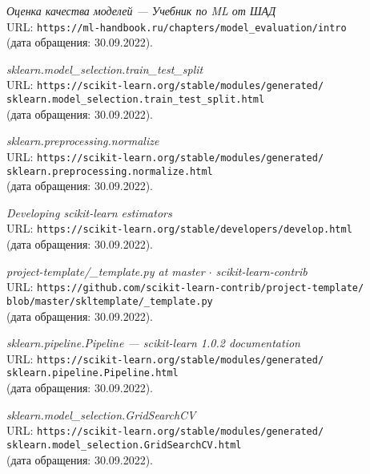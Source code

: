 \begin{thebibliography}{99}    
{\itshape Оценка качества моделей --- Учебник по ML от ШАД}\\
URL: \texttt{https://ml-handbook.ru/chapters/model\_evaluation/intro}\\
(дата обращения: 30.09.2022).

{\itshape sklearn.model\_selection.train\_test\_split}\\
URL: \texttt{https://scikit-learn.org/stable/modules/generated/\\sklearn.model\_selection.train\_test\_split.html}\\
(дата обращения: 30.09.2022).

{\itshape sklearn.preprocessing.normalize}\\
URL: \texttt{https://scikit-learn.org/stable/modules/generated/\\sklearn.preprocessing.normalize.html}\\
(дата обращения: 30.09.2022).

{\itshape Developing scikit-learn estimators}\\
URL: \texttt{https://scikit-learn.org/stable/developers/develop.html}\\
(дата обращения: 30.09.2022).

{\itshape project-template/\_template.py at master $\cdot$ scikit-learn-contrib}\\
URL: \texttt{https://github.com/scikit-learn-contrib/project-template/\\blob/master/skltemplate/\_template.py}\\
(дата обращения: 30.09.2022).

{\itshape sklearn.pipeline.Pipeline --- scikit-learn 1.0.2 documentation}\\
URL: \texttt{https://scikit-learn.org/stable/modules/generated/\\sklearn.pipeline.Pipeline.html}\\
(дата обращения: 30.09.2022).

{\itshape sklearn.model\_selection.GridSearchCV}\\
URL: \texttt{https://scikit-learn.org/stable/modules/generated/\\sklearn.model\_selection.GridSearchCV.html}\\
(дата обращения: 30.09.2022).


\end{thebibliography}
